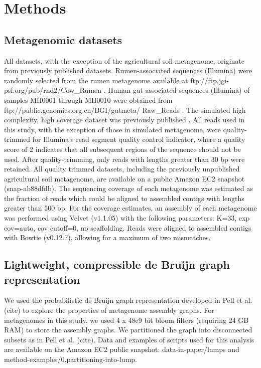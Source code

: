 \documentclass[10pt]{article}
\begin{document}
\section*{Methods}

\subsection*{Metagenomic datasets}
All datasets, with the exception of the agricultural soil metagenome,
originate from previously published datasets. Rumen-associated
sequences (Illumina) were randomly selected from the rumen metagenome
available at ftp://ftp.jgi-psf.org/pub/rnd2/Cow\_Rumen
\cite{Hess:2011p686}. Human-gut associated sequences (Illumina) of
samples MH0001 through MH0010 were obtained from
ftp://public.genomics.org.cn/BGI/gutmeta/ Raw\_Reads
\cite{Qin:2010p189}.  The simulated high complexity, high coverage
dataset was previously published \cite{Pignatelli:2011p742}.  All
reads used in this study, with the exception of those in simulated
metagenome, were quality-trimmed for Illumina's read segment quality
control indicator, where a quality score of 2 indicates that all
subsequent regions of the sequence should not be used. After
quality-trimming, only reads with lengths greater than 30 bp were
retained. All quality trimmed datasets, including the previously
unpublished agricultural soil metagenome, are available on a public
Amazon EC2 snapshot (snap-ab88dfdb).  The sequencing coverage of each
metagenome was estimated as the fraction of reads which could be
aligned to assembled contigs with lengths greater than 500 bp.  For
the coverage estimates, an assembly of each metagenome was performed
using Velvet (v1.1.05) with the following parameters: K=33, exp
cov=auto, cov cutoff=0, no scaffolding.  Reads were aligned to
assembled contigs with Bowtie (v0.12.7), allowing for a maximum of two
mismatches.

\subsection*{Lightweight, compressible de Bruijn graph representation}

We used the probabilistic de Bruijn graph representation developed in
Pell et al. (cite) to explore the properties of metagenome assembly
graphs.  For metagenomes in this study, we used 4 x 48e9 bit bloom
filters (requiring 24 GB RAM) to store the assembly graphs.  We
partitioned the graph into disconnected subsets as in Pell et
al. (cite). Data and examples of scripts used for this analysis are
available on the Amazon EC2 public snapshot: data-in-paper/lumps and
method-examples/0.partitioning-into-lump.
\end{document}

